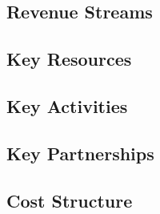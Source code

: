 \subsection{Revenue Streams} %
\label{sub:revenue_streams}
\subsection{Key Resources} %
\label{sub:key_resources}
\subsection{Key Activities} %
\label{sub:key_activities}
\subsection{Key Partnerships} %
\label{sub:key_partnerships}
\subsection{Cost Structure} %
\label{sub:cost_structure}
